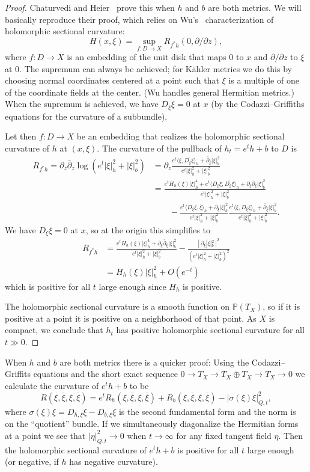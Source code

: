 \documentclass[10pt,a4paper]{amsart}
\newcommand{\kk}[1]{\mathbb{#1}}
\def\<{\langle}
\def\>{\rangle}
\def\ov#1{\overline{#1}}
\def\hsc{holomorphic sectional curvature}
\begin{document}
\begin{proof}
Chaturvedi and Heier~\cite{chaturvedi2020hermitian} prove this when $h$ and $b$
are both metrics.
We will basically reproduce their proof, which relies on
Wu's~\cite{wu1973remark} characterization of \hsc:
$$
H(x, \xi) = \sup_{f : D \to X} R_{f^*h}(0, \partial/\partial z),
$$
where $f : D \to X$ is an embedding of the unit disk that maps
$0$ to $x$ and $\partial/\partial z$ to $\xi$ at $0$.
The supremum can always be achieved; for K\"ahler metrics we do this by
choosing normal coordinates centered at a point such that $\xi$ is a multiple
of one of the coordinate fields at the center. (Wu handles general Hermitian
metrics.) When the supremum is achieved, we have $D_\xi \xi = 0$ at $x$ (by the
Codazzi--Griffiths equations for the curvature of a subbundle).

Let then $f : D \to X$ be an embedding that realizes the \hsc{} of $h$ at
$(x,\xi)$.
The curvature of the pullback of $h_t = e^t h + b$ to $D$ is
\begin{align*}
R_{f^*h}
= \partial_z \bar\partial_z \log(e^t |\xi|^2_h + |\xi|^2_b)
&= \partial_z \frac{e^t \<\xi, \ov{D_\xi\xi}\>_h + \bar\partial_\xi |\xi|^2_b}{e^t |\xi|^2_h + |\xi|^2_b}
\\
&= \frac{e^t H_h(\xi)|\xi|^4_h + e^t \<D_\xi \xi, \ov{D_\xi\xi}\>_h + \partial_\xi\bar\partial_\xi |\xi|^2_b}{e^t |\xi|^2_h + |\xi|^2_b}
\\
&\qquad
- \frac{e^t \<D_\xi \xi, \ov{\xi}\>_h + \partial_\xi |\xi|^2_b}{e^t |\xi|^2_h + |\xi|^2_b}
\frac{e^t \<\xi, \ov{D_\xi\xi}\>_h + \bar\partial_\xi |\xi|^2_b}{e^t |\xi|^2_h + |\xi|^2_b}.
\end{align*}
We have $D_\xi \xi = 0$ at $x$, so at the origin this simplifies to
\begin{align*}
R_{f^*h}
&= \frac{e^t H_h(\xi)|\xi|^4_h + \partial_\xi\bar\partial_\xi |\xi|^2_b}{e^t |\xi|^2_h + |\xi|^2_b}
- \frac{|\, \partial_\xi |\xi|^2_b \,|^2}{(e^t |\xi|^2_h + |\xi|^2_b)^2}
\\
&= H_h(\xi) |\xi|^2_h + O(e^{-t})
\end{align*}
which is positive for all $t$ large enough since $H_h$ is positive.

The \hsc{} is a smooth function on $\kk P(T_X)$, so if it is positive at a
point it is positive on a neighborhood of that point.
As $X$ is compact, we conclude that $h_t$ has positive \hsc{} for all $t \gg 0$.
\end{proof}


When $h$ and $b$ are both metrics there is a quicker proof:
Using the Codazzi--Griffits equations and the short exact sequence $0 \to T_X
\to T_X \oplus T_X \to T_X \to 0$ we calculate the curvature of $e^t h+b$ to be
$$
R(\xi, \ov\xi, \xi, \ov\xi)
= e^t R_h(\xi, \ov\xi, \xi, \ov\xi) + R_b(\xi, \ov\xi, \xi, \ov\xi)
- |\sigma(\xi)\xi|^2_{Q,t},
$$
where $\sigma(\xi)\xi = D_{h,\xi}\xi - D_{b,\xi} \xi$ is the second fundamental
form and the norm is on the ``quotient'' bundle.
If we simultaneously diagonalize the Hermitian forms at a point we see that
$|\eta|^2_{Q,t} \to 0$ when $t \to \infty$ for any fixed tangent field $\eta$.
Then the \hsc{} of $e^t h + b$ is positive for all $t$ large enough (or
negative, if $h$ has negative curvature).
\end{document}
